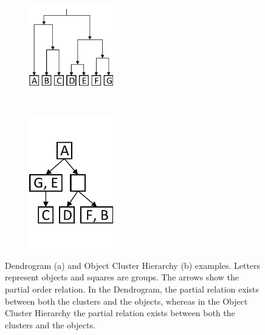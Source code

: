 \noindent
\begin{figure}[ht!]
  \centering
  \begin{subfigure}[t]{0.5\textwidth}
  	\centering
    \includegraphics[width=0.40\textwidth]{hierarchical-clustering-example2}
    \caption{}
	\label{fig:hierarchical-example} 
  \end{subfigure}%
  ~
  \begin{subfigure}[t]{0.5\textwidth}
  	\centering
    \includegraphics[width=0.40\textwidth, trim={0 1.15cm 0 1.15cm}, clip]{OCH-clustering-example}
    \caption{}
	 \label{fig:och-example} 
  \end{subfigure}
  \caption{Dendrogram (a) and Object Cluster Hierarchy (b) examples. Letters represent objects and squares are groups. The arrows show the partial order relation. In the Dendrogram, the partial relation exists between both the clusters and the objects, whereas in the Object Cluster Hierarchy the partial relation exists between both the clusters and the objects.}
\end{figure}